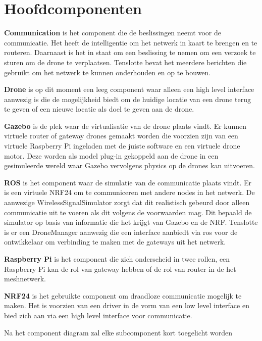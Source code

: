 \documentclass[a4paper, 11pt, oneside]{report}
\begin{document}
\section{Hoofdcomponenten}

\textbf{Communication} is het component die de beslissingen neemt voor de communicatie.
Het heeft de intelligentie om het netwerk in kaart te brengen en te routeren.
Daarnaast is het in staat om een beslissing te nemen om een verzoek te sturen om de drone te verplaatsen.
Tenslotte bevat het meerdere berichten die gebruikt om het netwerk te kunnen onderhouden en op te bouwen.    

\textbf{Drone} is op dit moment een leeg component waar alleen een high level interface aanwezig is die de mogelijkheid biedt om de huidige locatie van een drone terug te geven of een nieuwe locatie als doel te geven aan de drone. 

\textbf{Gazebo} is de plek waar de virtualisatie van de drone plaats vindt.
Er kunnen virtuele router of gateway drones gemaakt worden die voorzien zijn van een virtuele Raspberry Pi ingeladen met de juiste software en een virtuele drone motor.
Deze worden als model plug-in gekoppeld aan de drone in een gesimuleerde wereld waar Gazebo vervolgens physics op de drones kan uitvoeren. 

\textbf{ROS} is het component waar de simulatie van de communicatie plaats vindt.
Er is een virtuele NRF24 om te communiceren met andere nodes in het netwerk.
De aanwezige WirelessSignalSimulator zorgt dat dit realistisch gebeurd door alleen communicatie uit te voeren als dit volgens de voorwaarden mag.
Dit bepaald de simulator op basis van informatie die het krijgt van Gazebo en de NRF.
Tenslotte is er een DroneManager aanwezig die een interface aanbiedt via ros voor de ontwikkelaar om verbinding te maken met de gateways uit het netwerk.

\textbf{Raspberry Pi} is het component die zich onderscheid in twee rollen, een Raspberry Pi kan de rol van gateway hebben of de rol van router in de het meshnetwerk.

\textbf{NRF24} is het gebruikte component om draadloze communicatie mogelijk te maken. Het is voorzien van een driver in de vorm van een low level interface en bied zich aan via een high level interface voor communicatie.

Na het component diagram zal elke subcomponent kort toegelicht worden
\end{document}
